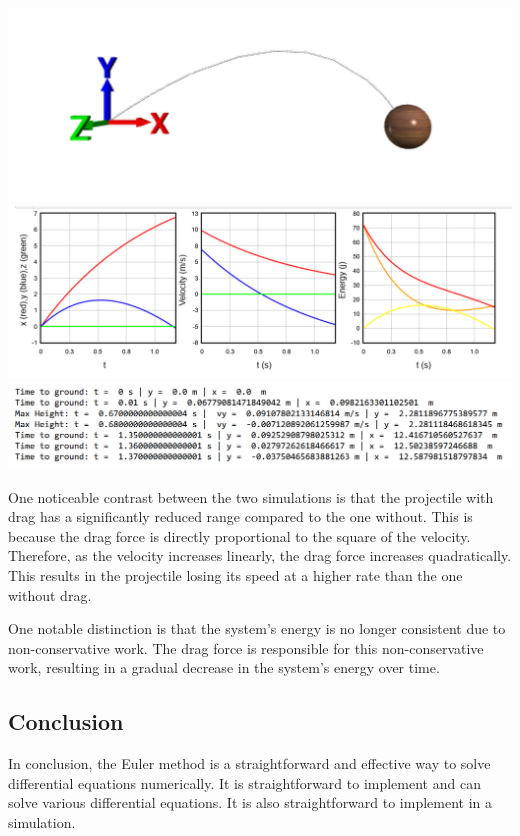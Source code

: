 \documentclass[11pt]{article}
\begin{document}
\includegraphics{images/drag/vis.png}
\includegraphics{images/drag/graphs.png}
\includegraphics{images/drag/output.png}

One noticeable contrast between the two simulations is that the
projectile with drag has a significantly reduced range compared to the
one without. This is because the drag force is directly proportional to
the square of the velocity. Therefore, as the velocity increases
linearly, the drag force increases quadratically. This results in the
projectile losing its speed at a higher rate than the one without drag.

One notable distinction is that the system's energy is no longer
consistent due to non-conservative work. The drag force is responsible
for this non-conservative work, resulting in a gradual decrease in the
system's energy over time.

    \hypertarget{conclusion}{%
\subsection{Conclusion}\label{conclusion}}

    In conclusion, the Euler method is a straightforward and effective way
to solve differential equations numerically. It is straightforward to
implement and can solve various differential equations. It is also
straightforward to implement in a simulation.
\end{document}
